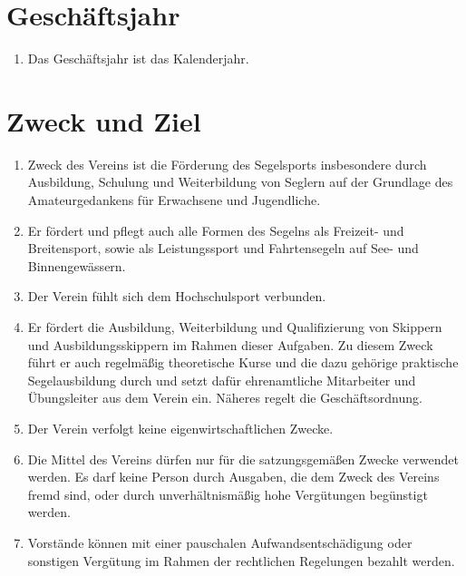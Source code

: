 \documentclass[10pt, twocolumn, parskip=half]{scrartcl}
\begin{document}
\section{Geschäftsjahr}
\begin{enumerate}[noitemsep]
	\item Das Geschäftsjahr ist das Kalenderjahr.
\end{enumerate}

\section{Zweck und Ziel}
\begin{enumerate}[noitemsep]
	\item Zweck des Vereins ist die Förderung des Segelsports insbesondere durch Ausbildung, Schulung und Weiterbildung von Seglern auf der Grundlage des Amateurgedankens für Erwachsene und Jugendliche.
	\item Er fördert und pflegt auch alle Formen des Segelns als Freizeit- und Breitensport, sowie als Leistungssport und Fahrtensegeln auf See- und Binnengewässern.
	\item Der Verein fühlt sich dem Hochschulsport verbunden.
	\item Er fördert die Ausbildung, Weiterbildung und Qualifizierung von Skippern und Ausbildungsskippern im Rahmen dieser Aufgaben. Zu diesem Zweck führt er auch regelmäßig theoretische Kurse und die dazu gehörige praktische Segelausbildung durch und setzt dafür ehrenamtliche Mitarbeiter und Übungsleiter aus dem Verein ein. Näheres regelt die Geschäftsordnung.
	\item Der Verein verfolgt keine eigenwirtschaftlichen Zwecke.
	\item Die Mittel des Vereins dürfen nur für die satzungsgemäßen Zwecke verwendet werden. Es darf keine Person durch Ausgaben, die dem Zweck des Vereins fremd sind, oder durch unverhältnismäßig hohe Vergütungen begünstigt werden.
	\item Vorstände können mit einer pauschalen Aufwandsentschädigung oder sonstigen Vergütung im Rahmen der rechtlichen Regelungen bezahlt werden.	
\end{enumerate}
\end{document}
